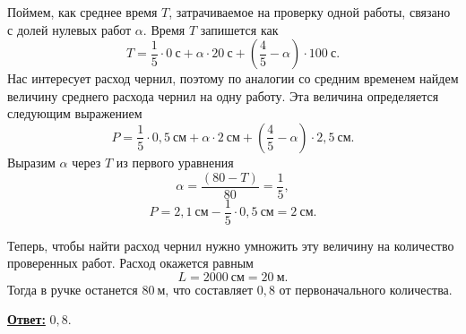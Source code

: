 	Поймем, как среднее время $T$, затрачиваемое на проверку одной работы, связано с долей нулевых работ $\alpha$. Время $T$ запишется как
\[
	T = \frac{1}{5} \cdot 0~\text{с} + \alpha \cdot20~\text{с} + \left( \frac{4}{5} - \alpha \right) \cdot 100~\text{с}.
\]
Нас интересует расход чернил, поэтому по аналогии со средним временем найдем величину среднего расхода чернил на одну работу. Эта величина определяется следующим выражением
\[
	P = \frac{1}{5} \cdot 0{,}5~\text{см} + \alpha \cdot 2~\text{см} + \left( \frac{4}{5} - \alpha \right) \cdot 2{,}5~\text{см}.
\]
Выразим $\alpha$ через $T$ из первого уравнения
\[
	\alpha = \frac{\left( 80 - T \right)}{80} = \frac{1}{5},
\]
\[
	P = 2{,}1~\text{см} - \frac{1}{5} \cdot 0{,}5~\text{см} = 2~\text{см}.
\]

	Теперь, чтобы найти расход чернил нужно умножить эту величину на количество проверенных работ. Расход окажется равным
\[
	L = 2000~\text{см} = 20~\text{м}.
\]
Тогда в ручке останется $80~\text{м}$, что составляет $0{,}8$ от первоначального количества.

\underline{\textbf{Ответ:}} $0{,}8$.